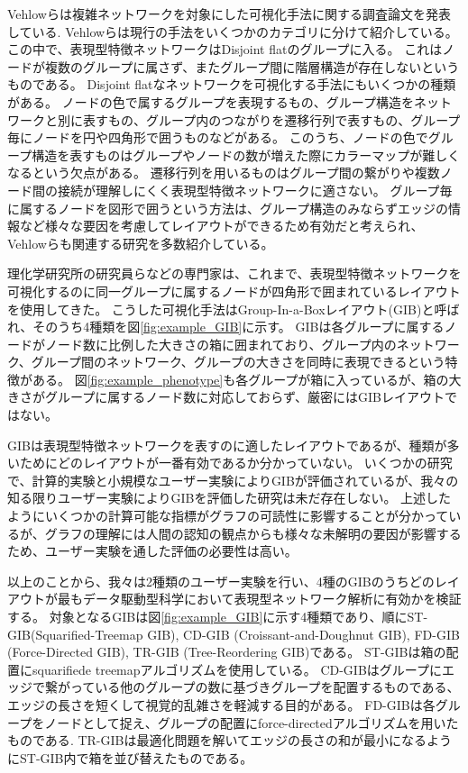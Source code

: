 \documentclass{kuee}
\begin{document}
Vehlowらは複雑ネットワークを対象にした可視化手法に関する調査論文を発表している\cite{Vehlow2017VisualizingGS}.
Vehlowらは現行の手法をいくつかのカテゴリに分けて紹介している。
この中で、表現型特徴ネットワークはDisjoint flatのグループに入る。
これはノードが複数のグループに属さず、またグループ間に階層構造が存在しないというものである。
Disjoint flatなネットワークを可視化する手法にもいくつかの種類がある。
ノードの色で属するグループを表現するもの、グループ構造をネットワークと別に表すもの、グループ内のつながりを遷移行列で表すもの、グループ毎にノードを円や四角形で囲うものなどがある。
このうち、ノードの色でグループ構造を表すものはグループやノードの数が増えた際にカラーマップが難しくなるという欠点がある。
遷移行列を用いるものはグループ間の繋がりや複数ノード間の接続が理解しにくく表現型特徴ネットワークに適さない。
グループ毎に属するノードを図形で囲うという方法は、グループ構造のみならずエッジの情報など様々な要因を考慮してレイアウトができるため有効だと考えられ、Vehlowらも関連する研究を多数紹介している。

理化学研究所の研究員らなどの専門家は、これまで、表現型特徴ネットワークを可視化するのに同一グループに属するノードが四角形で囲まれているレイアウトを使用してきた。
こうした可視化手法はGroup-In-a-Boxレイアウト(GIB)と呼ばれ、そのうち4種類を図\ref{fig:example_GIB}に示す。
GIBは各グループに属するノードがノード数に比例した大きさの箱に囲まれており、グループ内のネットワーク、グループ間のネットワーク、グループの大きさを同時に表現できるという特徴がある。
図\ref{fig:example_phenotype}も各グループが箱に入っているが、箱の大きさがグループに属するノード数に対応しておらず、厳密にはGIBレイアウトではない。

GIBは表現型特徴ネットワークを表すのに適したレイアウトであるが、種類が多いためにどのレイアウトが一番有効であるか分かっていない。
いくつかの研究\cite{onoue2017optimal,chaturvedi2014group}で、計算的実験と小規模なユーザー実験によりGIBが評価されているが、我々の知る限りユーザー実験によりGIBを評価した研究は未だ存在しない。
上述したようにいくつかの計算可能な指標がグラフの可読性に影響することが分かっている\cite{harel2000fast,koren2003drawing,hachul2004drawing,giacomo}が、グラフの理解には人間の認知の観点からも様々な未解明の要因が影響するため、ユーザー実験を通した評価の必要性は高い。

以上のことから、我々は2種類のユーザー実験を行い、4種のGIBのうちどのレイアウトが最もデータ駆動型科学において表現型ネットワーク解析に有効かを検証する。
対象となるGIBは図\ref{fig:example_GIB}に示す4種類であり、順にST-GIB(Squarified-Treemap GIB), CD-GIB (Croissant-and-Doughnut GIB), FD-GIB (Force-Directed GIB), TR-GIB (Tree-Reordering GIB)である。
ST-GIBは箱の配置にsquarifiede treemapアルゴリズム\cite{bruls2000squarified}を使用している。
CD-GIBはグループにエッジで繋がっている他のグループの数に基づきグループを配置するものである、エッジの長さを短くして視覚的乱雑さを軽減する目的がある\cite{chaturvedi2014group}。
FD-GIBは各グループをノードとして捉え、グループの配置にforce-directedアルゴリズムを用いたものである\cite{chaturvedi2014group}.
TR-GIBは最適化問題を解いてエッジの長さの和が最小になるようにST-GIB内で箱を並び替えたものである。
\end{document}
